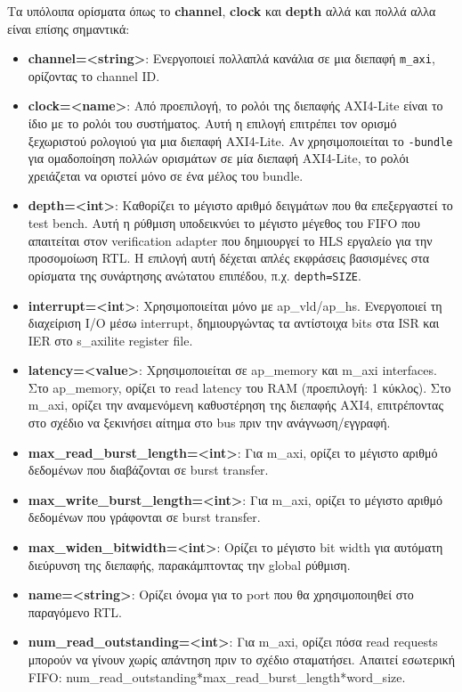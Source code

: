 Τα υπόλοιπα ορίσματα όπως το \textbf{channel}, \textbf{clock} και \textbf{depth} αλλά και πολλά αλλα είναι επίσης σημαντικά:

\begin{itemize}
  \item \textbf{channel=<string>}: Ενεργοποιεί πολλαπλά κανάλια σε μια διεπαφή \texttt{m\_axi}, ορίζοντας το channel ID.
  \item \textbf{clock=<name>}: Από προεπιλογή, το ρολόι της διεπαφής AXI4-Lite είναι το ίδιο με το ρολόι του συστήματος.
  Αυτή η επιλογή επιτρέπει τον ορισμό ξεχωριστού ρολογιού για μια διεπαφή AXI4-Lite. Αν χρησιμοποιείται το \texttt{-bundle} για ομαδοποίηση πολλών ορισμάτων σε μία διεπαφή AXI4-Lite,
  το ρολόι χρειάζεται να οριστεί μόνο σε ένα μέλος του bundle.
  \item \textbf{depth=<int>}: Καθορίζει το μέγιστο αριθμό δειγμάτων που θα επεξεργαστεί το test bench.
  Αυτή η ρύθμιση υποδεικνύει το μέγιστο μέγεθος του FIFO που απαιτείται στον verification adapter που δημιουργεί το HLS εργαλείο για την προσομοίωση RTL.
  Η επιλογή αυτή δέχεται απλές εκφράσεις βασισμένες στα ορίσματα της συνάρτησης ανώτατου επιπέδου, π.χ. \texttt{depth=SIZE}.
  \item \textbf{interrupt=<int>}: Χρησιμοποιείται μόνο με ap\_vld/ap\_hs. Ενεργοποιεί τη διαχείριση I/O μέσω interrupt, δημιουργώντας τα αντίστοιχα bits στα ISR και IER στο s\_axilite register file.
  \item \textbf{latency=<value>}: Χρησιμοποιείται σε ap\_memory και m\_axi interfaces. Στο ap\_memory, ορίζει το read latency του RAM (προεπιλογή: 1 κύκλος).
  Στο m\_axi, ορίζει την αναμενόμενη καθυστέρηση της διεπαφής AXI4, επιτρέποντας στο σχέδιο να ξεκινήσει αίτημα στο bus πριν την ανάγνωση/εγγραφή.
  \item \textbf{max\_read\_burst\_length=<int>}: Για m\_axi, ορίζει το μέγιστο αριθμό δεδομένων που διαβάζονται σε burst transfer.
  \item \textbf{max\_write\_burst\_length=<int>}: Για m\_axi, ορίζει το μέγιστο αριθμό δεδομένων που γράφονται σε burst transfer.
  \item \textbf{max\_widen\_bitwidth=<int>}: Ορίζει το μέγιστο bit width για αυτόματη διεύρυνση της διεπαφής, παρακάμπτοντας την global ρύθμιση.
  \item \textbf{name=<string>}: Ορίζει όνομα για το port που θα χρησιμοποιηθεί στο παραγόμενο RTL.
  \item \textbf{num\_read\_outstanding=<int>}: Για m\_axi, ορίζει πόσα read requests μπορούν να γίνουν χωρίς απάντηση πριν το σχέδιο σταματήσει. Απαιτεί εσωτερική FIFO: num\_read\_outstanding*max\_read\_burst\_length*word\_size.

\end{itemize}
